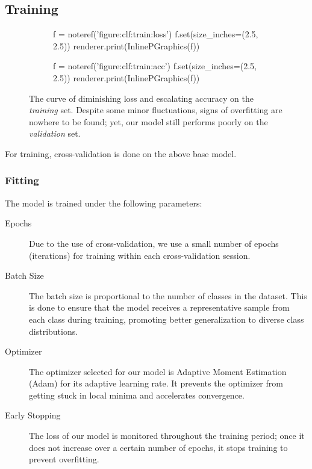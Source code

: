 \documentclass[letterpaper]{article} %
\begin{document}
\subsection{Training}
\begin{figure*}[t!]
  \centering
  \renewcommand\sffamily{}
  \begin{subfigure}[t]{.45\textwidth}
    \centering
    \begin{python}
      f = noteref('figure:clf:train:loss')
      f.set(size_inches=(2.5, 2.5))
      renderer.print(InlinePGraphics(f))
    \end{python}
  \end{subfigure}
  \begin{subfigure}[t]{.45\textwidth}
    \centering
    \begin{python}
      f = noteref('figure:clf:train:acc')
      f.set(size_inches=(2.5, 2.5))
      renderer.print(InlinePGraphics(f))
    \end{python}
  \end{subfigure}
  \caption{
    The curve of diminishing loss and escalating accuracy
    on the \emph{training} set.
    Despite some minor fluctuations, signs of overfitting 
    are nowhere to be found; yet,
    our model still performs poorly on the \emph{validation} set.
  }\label{figure:clf:train}
\end{figure*}

For training, cross-validation is done on the above base model.

\subsubsection{Fitting}
The model is trained under the following parameters:
\begin{description}
  \item[Epochs]
  Due to the use of cross-validation,
  we use a small number of epochs (iterations) for training
  within each cross-validation session.
  \item[Batch Size]
  The batch size is proportional to the number of classes in the dataset. 
  This is done to ensure that the model receives a representative sample 
  from each class during training, promoting better generalization to 
  diverse class distributions.
  \item[Optimizer]
  The optimizer selected for our model is 
  Adaptive Moment Estimation (Adam)
  for its adaptive learning rate. 
  It prevents the optimizer from getting stuck in local minima 
  and accelerates convergence.
  \item[Early Stopping]
  The loss of our model is monitored throughout
  the training period; once it does not increase
  over a certain number of epochs, it stops training
  to prevent overfitting.
\end{description}
\end{document}
